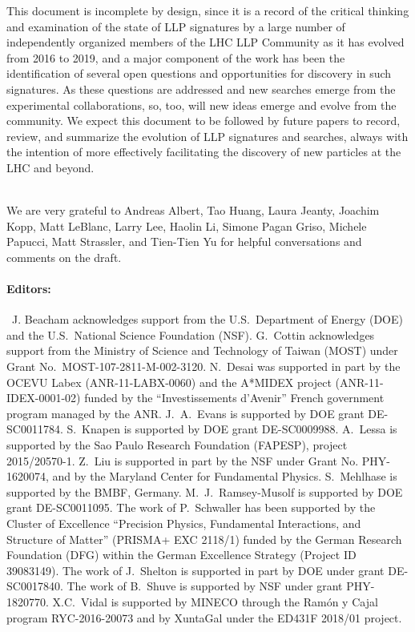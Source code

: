 This document is incomplete by design, since it is a record of the critical thinking and examination of the state of LLP signatures by a large number of independently organized members of the LHC LLP Community as it has evolved from 2016 to 2019, and a major component of the work has been the identification of several open questions and opportunities for discovery in such signatures.
As these questions are addressed and new searches emerge from the experimental collaborations, so, too, will new ideas emerge and evolve from the community.
We expect this document to be followed by future papers to record, review, and summarize the evolution of LLP signatures and searches, always with the intention of more effectively facilitating the discovery of new particles at the LHC and beyond. \\

\vspace{\baselineskip}

\\

We are very grateful to Andreas Albert, Tao Huang, Laura Jeanty, Joachim Kopp, Matt LeBlanc, Larry Lee, Haolin Li, Simone Pagan Griso, Michele Papucci, Matt Strassler, and Tien-Tien Yu for helpful conversations and comments on the draft.\\

\paragraph{Editors:}~J. Beacham acknowledges support from the U.S.~Department of Energy (DOE) and the U.S.~National Science Foundation (NSF). G.~Cottin acknowledges support from the Ministry of Science and Technology of Taiwan (MOST) under Grant No.~MOST-107-2811-M-002-3120. N.~Desai was supported in part by the OCEVU Labex (ANR-11-LABX-0060) and the A*MIDEX project (ANR-11-IDEX-0001-02) funded by the ``Investissements d'Avenir'' French government program managed by the ANR. J.~A.~Evans is supported by DOE grant DE-SC0011784. S.~Knapen is supported by DOE grant DE-SC0009988. A.~Lessa is supported by the Sao Paulo Research Foundation (FAPESP), project 2015/20570-1. Z.~Liu is supported in part by the NSF under Grant No. PHY-1620074, and by the Maryland Center for Fundamental Physics. S.~Mehlhase is supported by the BMBF, Germany. M.~J.~Ramsey-Musolf is supported by DOE grant DE-SC0011095. The work of P.~Schwaller has been supported by the Cluster of Excellence ``Precision Physics, Fundamental Interactions, and Structure of Matter'' (PRISMA+ EXC 2118/1) funded by the German Research Foundation (DFG) within the German Excellence Strategy (Project ID 39083149). The work of J.~Shelton is supported in part by DOE under grant DE-SC0017840. The work of B.~Shuve is supported by NSF under grant PHY-1820770. X.C.~Vidal is supported by MINECO through the Ramón y Cajal program RYC-2016-20073 and by XuntaGal under the ED431F 2018/01 project. \\

